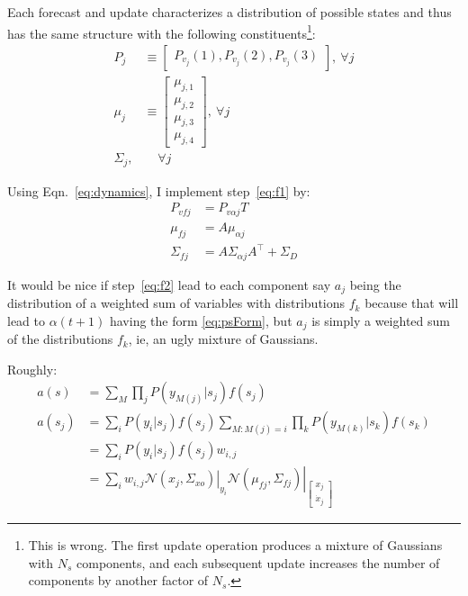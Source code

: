 \documentclass[12pt]{article}
\newcommand{\NormalE}[3]{{\mathcal{N}}\left.\left(#1,#2\right)\right|_{#3}}
\newcommand{\xdot}{{\dot x}}
\newcommand{\transpose}{^\top}
\newcommand{\ti}[2]{{#1}{(#2)}}                         %
\begin{document}
Each forecast and update characterizes a distribution of possible
states and thus has the same structure with the following
constituents\footnote{This is wrong.  The first update operation
  produces a mixture of Gaussians with $N_s$ components, and each
  subsequent update increases the number of components by another
  factor of $N_s$.}:
\begin{subequations}
  \label{eq:psForm}
  \begin{align}
    P_j &\equiv \begin{bmatrix} P_{v_j}(1), P_{v_j}(2), P_{v_j}(3)
    \end{bmatrix}, ~\forall j\\
    \mu_j &\equiv \begin{bmatrix} \mu_{j,1} \\ \mu_{j,2} \\ \mu_{j,3} \\
      \mu_{j,4} \end{bmatrix}, ~\forall j\\
    \Sigma_j, &~~~~~\forall j
  \end{align}
\end{subequations}

Using Eqn.~\eqref{eq:dynamics}, I implement step~\eqref{eq:f1} by:
\begin{subequations}
  \label{eq:f1I}
  \begin{align}
    P_{vfj} &= P_{v\alpha j} T\\
    \mu_{fj} &= A \mu_{\alpha j}\\
    \Sigma_{fj} &= A \Sigma_{\alpha j} A\transpose + \Sigma_D
  \end{align}
\end{subequations}

It would be nice if step~\eqref{eq:f2} lead to each component say
$a_j$ being the distribution of a weighted sum of variables with
distributions $f_k$ because that will lead to $\ti{\alpha}{t+1}$ having the
form \eqref{eq:psForm}, but $a_j$ is simply a weighted sum of the
distributions $f_k$, ie, an ugly mixture of Gaussians.

Roughly:
\begin{align*}
  a(s) &= \sum_M \prod_j P(y_{M(j)}|s_j) f(s_j) \\
  a(s_j) &= \sum_i  P(y_i|s_j) f(s_j) \sum_{M:M(j)=i}  \prod_k
  P(y_{M(k)}|s_k) f(s_k)\\
  &= \sum_i  P(y_i|s_j) f(s_j) w_{i,j} \\
  &= \sum_i  w_{i,j} \NormalE{x_j}{\Sigma_{xo}}{y_i}
  \NormalE{\mu_{fj}}{\Sigma_{fj}}{\begin{bmatrix} x_j\\ \xdot_j
    \end{bmatrix}}
\end{align*}
\end{document}
